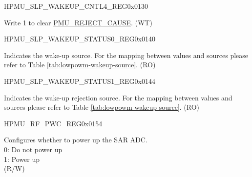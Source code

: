     \begin{register}{H}{PMU\_SLP\_WAKEUP\_CNTL4\_REG}{0x0130}\label{regdesc:PMUSLPWAKEUPCNTL4REG}
    \regnewline%
    \begin{regdesc}\begin{reglist}
    \label{fielddesc:PMUSLPREJECTCAUSECLR}\item [PMU\_SLP\_REJECT\_CAUSE\_CLR] Write 1 to clear \hyperref[fielddesc:PMUREJECTCAUSE]{PMU\_REJECT\_CAUSE}. (WT)
    \end{reglist}\end{regdesc}
    \end{register}


    \begin{register}{H}{PMU\_SLP\_WAKEUP\_STATUS0\_REG}{0x0140}\label{regdesc:PMUSLPWAKEUPSTATUS0REG}
    \regnewline%
    \begin{regdesc}\begin{reglist}
    \label{fielddesc:PMUWAKEUPCAUSE}\item [PMU\_WAKEUP\_CAUSE] Indicates the wake-up source. For the mapping between values and sources please refer to Table \ref{tab:lowpowm-wakeup-source}. (RO)
    \end{reglist}\end{regdesc}
    \end{register}

    \begin{register}{H}{PMU\_SLP\_WAKEUP\_STATUS1\_REG}{0x0144}\label{regdesc:PMUSLPWAKEUPSTATUS1REG}
    \regnewline%
    \begin{regdesc}\begin{reglist}
    \label{fielddesc:PMUREJECTCAUSE}\item [PMU\_REJECT\_CAUSE] Indicates the wake-up rejection source. For the mapping between values and sources please refer to Table \ref{tab:lowpowm-wakeup-source}. (RO)
    \end{reglist}\end{regdesc}
    \end{register}


\begin{register}{H}{PMU\_RF\_PWC\_REG}{0x0154}\label{regdesc:PMURFPWCREG}
%
%
%
\regnewline%
\begin{regdesc}\begin{reglist}
\label{fielddesc:PMUXPDPERIFI2C}\item [PMU\_XPD\_PERIF\_I2C] Configures whether to power up the SAR ADC. \\
0: Do not power up\\
1: Power up\\
(R/W)
\end{reglist}\end{regdesc}
\end{register}


